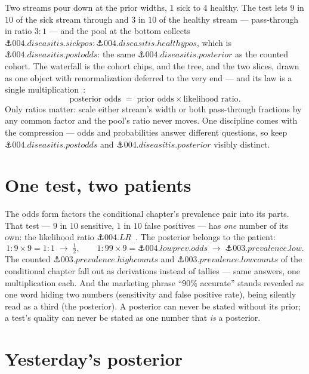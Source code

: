 \begin{narrative}
Two streams pour down at the prior widths, $1$ sick to $4$ healthy.
The test lets $9$ in $10$ of the sick stream through and $3$ in $10$
of the healthy stream — pass-through in ratio $3{:}1$ — and the pool
at the bottom collects
$\anchor{004.diseasitis.sickpos}{:}\anchor{004.diseasitis.healthypos}$,
which is $\anchor{004.diseasitis.postodds}$: the same
$\anchor{004.diseasitis.posterior}$ as the counted cohort. The
waterfall is the cohort chips, and the tree, and the two slices, drawn
as one object with renormalization deferred to the very end — and its
law is a single
multiplication~\cite{probability-yudkowsky-so8res-smith-et-al-bayes-rule-odds-form}:
\[
  \text{posterior odds} \;=\; \text{prior odds} \times
  \text{likelihood ratio} .
\]
Only ratios matter: scale either stream's width or both pass-through
fractions by any common factor and the pool's ratio never moves. One
discipline comes with the compression — odds and probabilities answer
different questions, so keep $\anchor{004.diseasitis.postodds}$ and
$\anchor{004.diseasitis.posterior}$ visibly distinct.

\section{One test, two patients}

The odds form factors the conditional chapter's prevalence pair into
its parts. That test — $9$ in $10$ sensitive, $1$ in $10$ false
positives — has \emph{one} number of its own: the likelihood ratio
$\anchor{004.LR}$~\cite{probability-3blue1brown-the-medical-test-paradox}.
The posterior belongs to the patient:
\[
  1{:}9 \times 9 = 1{:}1 \;\to\; \tfrac12,
  \qquad
  1{:}99 \times 9 = \anchor{004.lowprev.odds} \;\to\;
  \anchor{003.prevalence.low} .
\]
The counted $\anchor{003.prevalence.highcounts}$ and
$\anchor{003.prevalence.lowcounts}$ of the conditional chapter fall
out as derivations instead of tallies — same answers, one
multiplication each. And the marketing phrase ``$90\%$ accurate''
stands revealed as one word hiding two numbers (sensitivity and false
positive rate), being silently read as a third (the posterior). A
posterior can never be stated without its prior; a test's quality can
never be stated as one number that \emph{is} a posterior.

\section{Yesterday's posterior}


\end{narrative}
